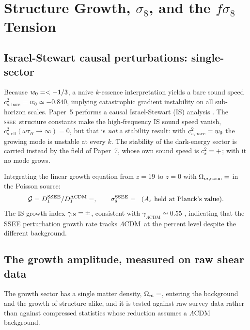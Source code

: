 \documentclass[12pt,a4paper]{article}
\newcommand{\SSEE}{\textsc{ssee}}
\newcommand{\LCDM}{$\Lambda$CDM}
\newcommand{\Omm}{\Omega_{m}}
\newcommand{\wz}{w_0}
\begin{document}
\section{Structure Growth, $\sigma_8$, and the $f\sigma_8$ Tension}
\label{sec:growth}

\subsection{Israel-Stewart causal perturbations: single-sector}
\label{sec:IS}

Because $\wz = \val{W0_d6} < -1/3$, a naive $k$-essence interpretation yields
a bare sound speed $c_{s,\mathrm{bare}}^2 = \wz \simeq -0.840$, implying
catastrophic gradient instability on all sub-horizon scales.
Paper~5 \citep{AlmeidaSSEE2026P5} performs a causal Israel-Stewart (IS)
analysis \citep{IsraelStewart1979}. The \SSEE\ structure constants make the
high-frequency IS sound speed vanish, $c_{s,\mathrm{eff}}^2(\omega\tau_\Pi\to\infty)=0$,
but that is \emph{not} a stability result: with $c^2_{s,\rm bare}=\wz$ the growing
mode is unstable at every $k$. The stability of the dark-energy sector is carried
instead by the field of Paper~7, whose own sound speed is
$c_s^2=+\val{cs2_condensado_d6}$; with it no mode grows.

Integrating the linear growth equation from $z=19$ to $z=0$
with $\Omega_{m,\mathrm{cosm}} = \val{OMEGA_M_TOTAL_d6}$ in the Poisson source:
\begin{equation}
  \mathcal{G} = D_1^{\mathrm{SSEE}}/D_1^{\Lambda\mathrm{CDM}} = \val{p5_G},
  \qquad
  \sigma_8^{\mathrm{SSEE}} = \val{p3_sigma8_IS} \;\;(A_s\ \text{held at Planck's value}).
  \label{eq:G_IS}
\end{equation}
The IS growth index $\gamma_{\mathrm{IS}} = \val{p3_gamma_IS}\pm\val{p3_gamma_IS_sigma}$, consistent with
$\gamma_{\Lambda\mathrm{CDM}} \simeq 0.55$ \citep{Lahav1991}, indicating that
the SSEE perturbation growth rate tracks \LCDM\ at the percent level despite
the different background.

\subsection{The growth amplitude, measured on raw shear data}
\label{sec:growth_raw}

The growth sector has a single matter density, $\Omm=\val{OMEGA_M_TOTAL_d6}$, entering the
background and the growth of structure alike, and it is tested against raw
survey data rather than against compressed statistics whose reduction assumes a
$\Lambda$CDM background.
\end{document}
